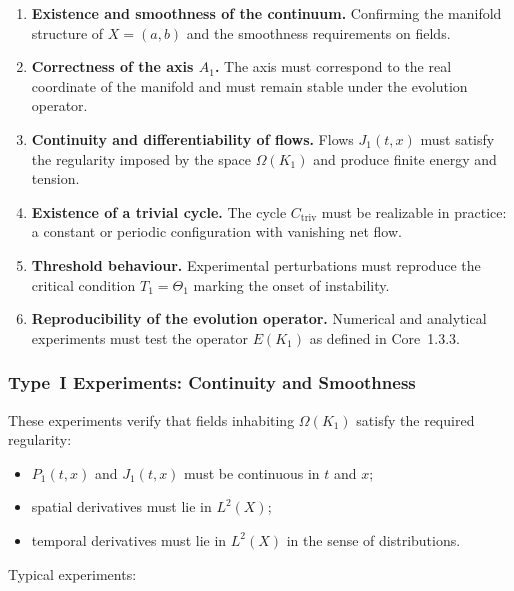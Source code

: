 \begin{enumerate}
    \item \textbf{Existence and smoothness of the continuum.}
          Confirming the manifold structure of $X=(a,b)$
          and the smoothness requirements on fields.

    \item \textbf{Correctness of the axis $A_1$.}
          The axis must correspond to the real coordinate of the
          manifold and must remain stable under the evolution operator.

    \item \textbf{Continuity and differentiability of flows.}
          Flows $J_1(t,x)$ must satisfy the regularity imposed by the
          space $\Omega(K_1)$ and produce finite energy and tension.

    \item \textbf{Existence of a trivial cycle.}
          The cycle $C_{\mathrm{triv}}$ must be realizable in practice:
          a constant or periodic configuration with vanishing net flow.

    \item \textbf{Threshold behaviour.}
          Experimental perturbations must reproduce the critical
          condition $T_1 = \Theta_1$ marking the onset of instability.

    \item \textbf{Reproducibility of the evolution operator.}
          Numerical and analytical experiments must test the
          operator $E(K_1)$ as defined in Core~1.3.3.
\end{enumerate}


\subsubsection{Type~I Experiments: Continuity and Smoothness}

These experiments verify that fields inhabiting $\Omega(K_1)$ satisfy the
required regularity:

\begin{itemize}
    \item $P_1(t,x)$ and $J_1(t,x)$ must be continuous in $t$ and $x$;
    \item spatial derivatives must lie in $L^2(X)$;
    \item temporal derivatives must lie in $L^2(X)$ in the sense of
          distributions.
\end{itemize}

Typical experiments:

